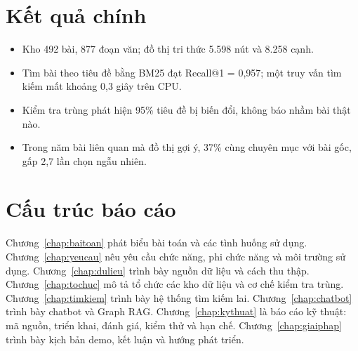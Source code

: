 \section{Kết quả chính}

\begin{itemize}
\item Kho 492 bài, 877 đoạn văn; đồ thị tri thức 5.598 nút và 8.258 cạnh.
\item Tìm bài theo tiêu đề bằng BM25 đạt Recall@1 = 0,957; một truy vấn tìm kiếm mất khoảng 0,3 giây trên CPU.
\item Kiểm tra trùng phát hiện 95\% tiêu đề bị biến đổi, không báo nhầm bài thật nào.
\item Trong năm bài liên quan mà đồ thị gợi ý, 37\% cùng chuyên mục với bài gốc, gấp 2,7 lần chọn ngẫu nhiên.
\end{itemize}

\section{Cấu trúc báo cáo}

Chương~\ref{chap:baitoan} phát biểu bài toán và các tình huống sử dụng. Chương~\ref{chap:yeucau} nêu yêu cầu chức
năng, phi chức năng và môi trường sử dụng. Chương~\ref{chap:dulieu} trình bày nguồn dữ liệu và cách thu thập.
Chương~\ref{chap:tochuc} mô tả tổ chức các kho dữ liệu và cơ chế kiểm tra trùng. Chương~\ref{chap:timkiem} trình
bày hệ thống tìm kiếm lai. Chương~\ref{chap:chatbot} trình bày chatbot và Graph RAG. Chương~\ref{chap:kythuat} là
báo cáo kỹ thuật: mã nguồn, triển khai, đánh giá, kiểm thử và hạn chế. Chương~\ref{chap:giaiphap} trình bày kịch
bản demo, kết luận và hướng phát triển.

